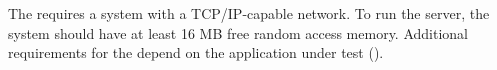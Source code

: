 The \gdserver requires a system with a TCP/IP-capable network. To run the server, the system should have at least 16 MB free random access memory. Additional requirements for the \gdserver depend on the application under test (\gdaut{}).
